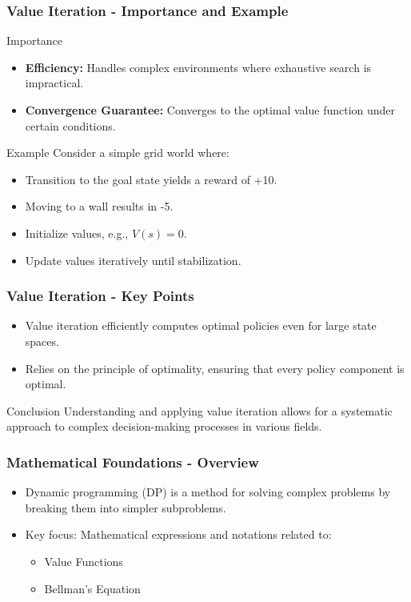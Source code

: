 \documentclass[aspectratio=169]{beamer}
\begin{document}
\begin{frame}[fragile]
    \frametitle{Value Iteration - Importance and Example}
    \begin{block}{Importance}
        \begin{itemize}
            \item \textbf{Efficiency:} Handles complex environments where exhaustive search is impractical.
            \item \textbf{Convergence Guarantee:} Converges to the optimal value function under certain conditions.
        \end{itemize}
    \end{block}
    
    \begin{block}{Example}
        Consider a simple grid world where:
        \begin{itemize}
            \item Transition to the goal state yields a reward of +10.
            \item Moving to a wall results in -5.
            \item Initialize values, e.g., \( V(s) = 0 \).
            \item Update values iteratively until stabilization.
        \end{itemize}
    \end{block}
\end{frame}

\begin{frame}[fragile]
    \frametitle{Value Iteration - Key Points}
    \begin{itemize}
        \item Value iteration efficiently computes optimal policies even for large state spaces.
        \item Relies on the principle of optimality, ensuring that every policy component is optimal.
    \end{itemize}
    \begin{block}{Conclusion}
        Understanding and applying value iteration allows for a systematic approach to complex decision-making processes in various fields.
    \end{block}
\end{frame}

\begin{frame}[fragile]
    \frametitle{Mathematical Foundations - Overview}
    \begin{itemize}
        \item Dynamic programming (DP) is a method for solving complex problems by breaking them into simpler subproblems.
        \item Key focus: Mathematical expressions and notations related to:
        \begin{itemize}
            \item Value Functions
            \item Bellman's Equation
        \end{itemize}
    \end{itemize}
\end{frame}
\end{document}
